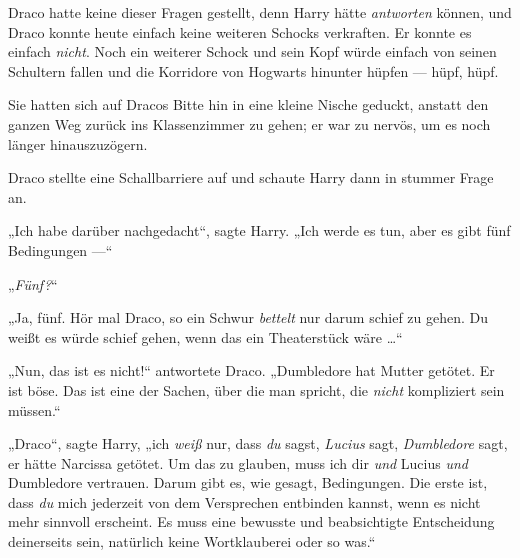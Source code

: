 Draco hatte keine dieser Fragen gestellt, denn Harry hätte \emph{antworten} können, und Draco konnte heute einfach keine weiteren Schocks verkraften. Er konnte es einfach \emph{nicht}. Noch ein weiterer Schock und sein Kopf würde einfach von seinen Schultern fallen und die Korridore von Hogwarts hinunter hüpfen — hüpf, hüpf.

\later

Sie hatten sich auf Dracos Bitte hin in eine kleine Nische geduckt, anstatt den ganzen Weg zurück ins Klassenzimmer zu gehen; er war zu nervös, um es noch länger hinauszuzögern.

Draco stellte eine Schallbarriere auf und schaute Harry dann in stummer Frage an.

„Ich habe darüber nachgedacht“, sagte Harry.
„Ich werde es tun, aber es gibt fünf Bedingungen —“

„\emph{Fünf?}“

„Ja, fünf. Hör mal Draco, so ein Schwur \emph{bettelt} nur darum schief zu gehen. Du weißt es würde schief gehen, wenn das ein Theaterstück wäre …“

„Nun, das ist es nicht!“ antwortete Draco.
„Dumbledore hat Mutter getötet. Er ist böse. Das ist eine der Sachen, über die man spricht, die \emph{nicht} kompliziert sein müssen.“

„Draco“, sagte Harry, „ich \emph{weiß} nur, dass \emph{du} sagst, \emph{Lucius} sagt, \emph{Dumbledore} sagt, er hätte Narcissa getötet. Um das zu glauben, muss ich dir \emph{und} Lucius \emph{und} Dumbledore vertrauen. Darum gibt es, wie gesagt, Bedingungen. Die erste ist, dass \emph{du} mich jederzeit von dem Versprechen entbinden kannst, wenn es nicht mehr sinnvoll erscheint. Es muss eine bewusste und beabsichtigte Entscheidung deinerseits sein, natürlich keine Wortklauberei oder so was.“

